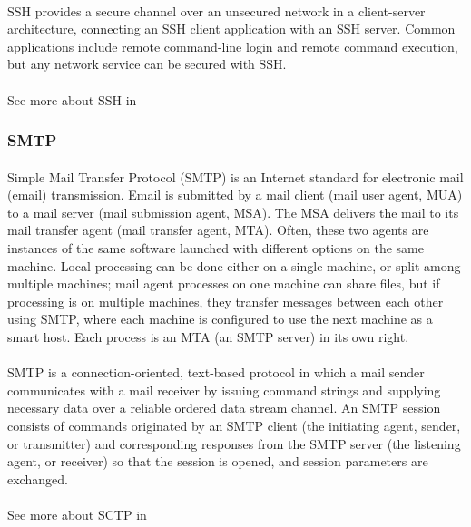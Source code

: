 \paragraph{}
SSH provides a secure channel over an unsecured network in a client-server architecture, connecting an SSH client application with an SSH server. Common applications include remote command-line login and remote command execution, but any network service can be secured with SSH. 
\paragraph{}
See more about SSH in \cite{SSH}


\subsubsection{SMTP}
\paragraph{}
Simple Mail Transfer Protocol (SMTP) is an Internet standard for electronic mail (email) transmission. Email is submitted by a mail client (mail user agent, MUA) to a mail server (mail submission agent, MSA). The MSA delivers the mail to its mail transfer agent (mail transfer agent, MTA). Often, these two agents are instances of the same software launched with different options on the same machine. Local processing can be done either on a single machine, or split among multiple machines; mail agent processes on one machine can share files, but if processing is on multiple machines, they transfer messages between each other using SMTP, where each machine is configured to use the next machine as a smart host. Each process is an MTA (an SMTP server) in its own right.
\paragraph{}
SMTP is a connection-oriented, text-based protocol in which a mail sender communicates with a mail receiver by issuing command strings and supplying necessary data over a reliable ordered data stream channel. An SMTP session consists of commands originated by an SMTP client (the initiating agent, sender, or transmitter) and corresponding responses from the SMTP server (the listening agent, or receiver) so that the session is opened, and session parameters are exchanged.
\paragraph{}
See more about SCTP in \cite{SMTP}



